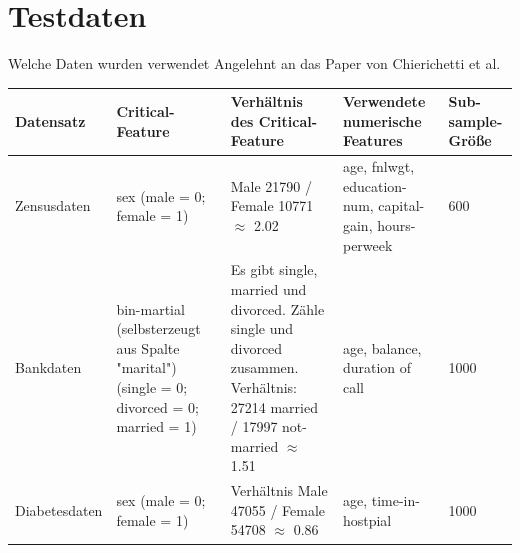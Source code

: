 \section{Testdaten}

\begin{frame}{Welche Daten wurden verwendet}
    Angelehnt an das Paper von Chierichetti et al. 

    \begin{table}[htbp]
        \centering
        \begin{scriptsize}
            \begin{tabular}{|p{1.45cm}||p{3.1cm}|p{3.5cm}|p{2.7cm}|p{0.9cm}|}
                \toprule
                Datensatz & Critical-Feature & Verhältnis des Critical-Feature & Verwendete numerische Features & Sub-sample-Größe\\
                \midrule
                Zensusdaten & sex (male = 0; female = 1) & Male 21790 / Female 10771 $\approx$ 2.02 & age, fnlwgt, education-num, capital-gain, hours-perweek & 600 \\
                \midrule
                Bankdaten & bin-martial (selbsterzeugt aus Spalte "marital") (single = 0; divorced = 0; married = 1) & Es gibt single, married und divorced. Zähle single und divorced zusammen. Verhältnis: 27214 married / 17997 not-married $\approx$ 1.51 & age, balance, duration of call & 1000 \\
                \midrule
                Diabetesdaten & sex (male = 0; female = 1) & Verhältnis Male 47055 / Female 54708 $\approx$ 0.86 & age, time-in-hostpial & 1000 \\
                \bottomrule
            \end{tabular}
        \end{scriptsize}
    \end{table}
\end{frame}